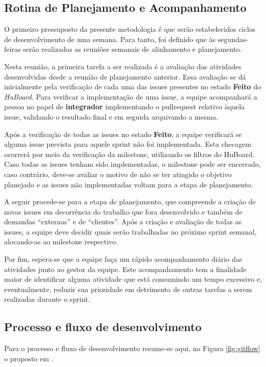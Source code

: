 \subsection{Rotina de Planejamento e Acompanhamento}
O primeiro pressuposto da presente metodologia é que serão estabelecidos ciclos de desenvolvimento de uma semana. Para tanto, foi definido que às segundas-feiras serão realizadas as reuniões semanais de alinhamento e planejamento.

Nesta reunião, a primeira tarefa a ser realizada é a avaliação das atividades desenvolvidas desde a reunião de planejamento anterior.
Essa avaliação se dá inicialmente pela verificação de cada uma das \glspl{issue} presentes no estado \textbf{Feito} do \textit{HuBoard}. Para verificar a implementação de uma \gls{issue}, a equipe acompanhará a pessoa no papel de \textbf{integrador} implementando o \gls{pullrequest} relativo àquela \gls{issue}, validando o resultado final e em seguida arquivando a mesma.

Após a verificação de todas as \glspl{issue} no estado \textbf{Feito}, a equipe verificará se alguma \gls{issue} prevista para aquele \gls{sprint} não foi implementada. Esta checagem ocorrerá por meio da verificação da \gls{milestone}, utilizando os filtros do HuBoard. Caso todas as \glspl{issue} tenham sido implementadas, o \gls{milestone} pode ser encerrado, caso contrário, deve-se avaliar o motivo de não se ter atingido o objetivo planejado e as \glspl{issue} não implementadas voltam para a etapa de planejamento.

A seguir procede-se para a etapa de planejamento, que compreende a criação de novas \glspl{issue} em decorrência do trabalho que fora desenvolvido e também de demandas ``externas'' e de ``clientes''. Após a criação e avaliação de todas as \glspl{issue}, a equipe deve decidir quais serão trabalhadas no próximo \gls{sprint} semanal, alocando-as ao \gls{milestone} respectivo.  

Por fim, espera-se que a equipe faça um rápido acompanhamento diário das atividades junto ao gestor da equipe. Este acompanhamento tem a finalidade maior de identificar alguma atividade que está consumindo um tempo excessivo e, eventualmente, reduzir sua prioridade em detrimento de outras tarefas a serem realizadas durante o \gls{sprint}.

\subsection{Processo e fluxo de desenvolvimento}
Para o processo e fluxo de desenvolvimento resume-se aqui, na Figura \ref{fig:gitflow} o proposto em .

